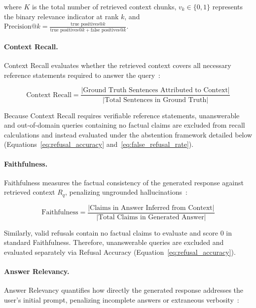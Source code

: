 where $K$ is the total number of retrieved context chunks, $v_k \in \{0, 1\}$ represents the binary relevance indicator at rank $k$, and $\text{Precision}@k = \frac{\text{true positives}@k}{\text{true positives}@k + \text{false positives}@k}$.

\paragraph{Context Recall.} Context Recall evaluates whether the retrieved context covers all necessary reference statements required to answer the query~\citep{es2024ragas}:

\begin{equation}
\label{eq:context_recall}
\text{Context Recall} = \frac{|\text{Ground Truth Sentences Attributed to Context}|}{|\text{Total Sentences in Ground Truth}|}
\end{equation}

Because Context Recall requires verifiable reference statements, unanswerable and out-of-domain queries containing no factual claims are excluded from recall calculations and instead evaluated under the abstention framework detailed below (Equations~\ref{eq:refusal_accuracy} and~\ref{eq:false_refusal_rate}).

\paragraph{Faithfulness.} Faithfulness measures the factual consistency of the generated response against retrieved context $R_q$, penalizing ungrounded hallucinations~\citep{es2024ragas}:

\begin{equation}
\label{eq:faithfulness}
\text{Faithfulness} = \frac{|\text{Claims in Answer Inferred from Context}|}{|\text{Total Claims in Generated Answer}|}
\end{equation}

Similarly, valid refusals contain no factual claims to evaluate and score 0 in standard Faithfulness. Therefore, unanswerable queries are excluded and evaluated separately via Refusal Accuracy (Equation~\ref{eq:refusal_accuracy}).

\paragraph{Answer Relevancy.} Answer Relevancy quantifies how directly the generated response addresses the user's initial prompt, penalizing incomplete answers or extraneous verbosity~\citep{es2024ragas}:

